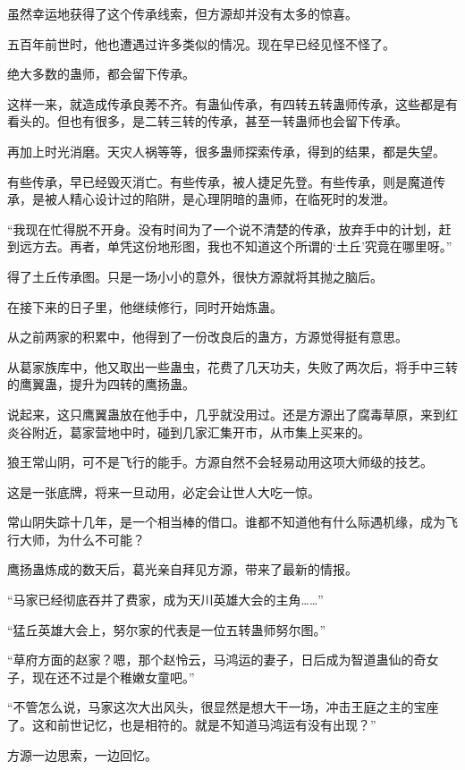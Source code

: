 \begin{this_body}
虽然幸运地获得了这个传承线索，但方源却并没有太多的惊喜。

五百年前世时，他也遭遇过许多类似的情况。现在早已经见怪不怪了。

绝大多数的蛊师，都会留下传承。

这样一来，就造成传承良莠不齐。有蛊仙传承，有四转五转蛊师传承，这些都是有看头的。但也有很多，是二转三转的传承，甚至一转蛊师也会留下传承。

再加上时光消磨。天灾人祸等等，很多蛊师探索传承，得到的结果，都是失望。

有些传承，早已经毁灭消亡。有些传承，被人捷足先登。有些传承，则是魔道传承，是被人精心设计过的陷阱，是心理阴暗的蛊师，在临死时的发泄。

“我现在忙得脱不开身。没有时间为了一个说不清楚的传承，放弃手中的计划，赶到远方去。再者，单凭这份地形图，我也不知道这个所谓的‘土丘’究竟在哪里呀。”

得了土丘传承图。只是一场小小的意外，很快方源就将其抛之脑后。

在接下来的日子里，他继续修行，同时开始炼蛊。

从之前两家的积累中，他得到了一份改良后的蛊方，方源觉得挺有意思。

从葛家族库中，他又取出一些蛊虫，花费了几天功夫，失败了两次后，将手中三转的鹰翼蛊，提升为四转的鹰扬蛊。

说起来，这只鹰翼蛊放在他手中，几乎就没用过。还是方源出了腐毒草原，来到红炎谷附近，葛家营地中时，碰到几家汇集开市，从市集上买来的。

狼王常山阴，可不是飞行的能手。方源自然不会轻易动用这项大师级的技艺。

这是一张底牌，将来一旦动用，必定会让世人大吃一惊。

常山阴失踪十几年，是一个相当棒的借口。谁都不知道他有什么际遇机缘，成为飞行大师，为什么不可能？

鹰扬蛊炼成的数天后，葛光亲自拜见方源，带来了最新的情报。

“马家已经彻底吞并了费家，成为天川英雄大会的主角……”

“猛丘英雄大会上，努尔家的代表是一位五转蛊师努尔图。”

“草府方面的赵家？嗯，那个赵怜云，马鸿运的妻子，日后成为智道蛊仙的奇女子，现在还不过是个稚嫩女童吧。”

“不管怎么说，马家这次大出风头，很显然是想大干一场，冲击王庭之主的宝座了。这和前世记忆，也是相符的。就是不知道马鸿运有没有出现？”

方源一边思索，一边回忆。


\end{this_body}
